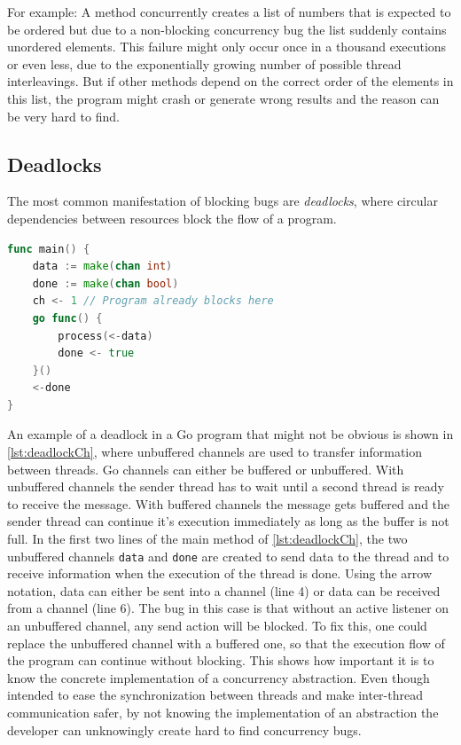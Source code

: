 \documentclass[english]{lni}
\begin{document}
For example: A method concurrently creates a list of numbers that is expected to be ordered but due to a non-blocking concurrency bug the list suddenly contains unordered elements.
This failure might only occur once in a thousand executions or even less, due to the exponentially growing number of possible thread interleavings.
But if other methods depend on the correct order of the elements in this list, the program might crash or generate wrong results and the reason can be very hard to find.

\subsection{Deadlocks}

The most common manifestation of blocking bugs are \emph{deadlocks}, where circular dependencies between resources block the flow of a program.

\begin{lstlisting}[float=h, language=Go, label=lst:deadlockCh, caption={Deadlock caused by misuse of an \emph{unbuffered Channel}}]
func main() {
    data := make(chan int)
    done := make(chan bool)
    ch <- 1 // Program already blocks here
    go func() {
        process(<-data)
        done <- true
    }()
    <-done
}
\end{lstlisting}

An example of a deadlock in a Go program that might not be obvious is shown in \cref{lst:deadlockCh}, where unbuffered channels are used to transfer information between threads.
Go channels can either be buffered or unbuffered.
With unbuffered channels the sender thread has to wait until a second thread is ready to receive the message.
With buffered channels the message gets buffered and the sender thread can continue it's execution immediately as long as the buffer is not full.
In the first two lines of the main method of \cref{lst:deadlockCh}, the two unbuffered channels \lstinline{data} and \lstinline{done} are created to send data to the thread and to receive information when the execution of the thread is done.
Using the arrow notation, data can either be sent into a channel (line 4) or data can be received from a channel (line 6).
The bug in this case is that without an active listener on an unbuffered channel, any send action will be blocked.
To fix this, one could replace the unbuffered channel with a buffered one, so that the execution flow of the program can continue without blocking.
This shows how important it is to know the concrete implementation of a concurrency abstraction.
Even though intended to ease the synchronization between threads and make inter-thread communication safer, by not knowing the implementation of an abstraction the developer can unknowingly create hard to find concurrency bugs.
\end{document}
